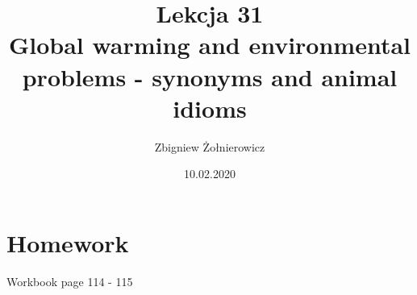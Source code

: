 \documentclass[a4paper]{article}
\begin{document}
\title{{\huge Lekcja 31} \\
{\large Global warming and environmental problems - synonyms and animal idioms}}
\author{Zbigniew Żołnierowicz}
\date{10.02.2020}
\maketitle
\section{Homework}
Workbook page 114 - 115
\end{document}

